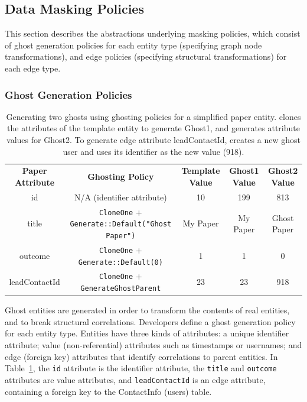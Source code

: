 \subsection{Data Masking Policies}
\label{sec:policies}

This section describes the abstractions underlying masking policies, which consist of ghost
generation policies for each entity type (specifying graph node transformations), and edge policies
(specifying structural transformations) for each edge type.

\subsubsection{Ghost Generation Policies}
\label{sec:ghosting}

\begin{table}[t!]
    \centering
    \footnotesize
\begin{tabular}{@{}ccccc@{}}
\textbf{Paper Attribute} & \textbf{Ghosting Policy} & \textbf{Template Value} & \textbf{Ghost1 Value} & \textbf{Ghost2 Value} 
  \\ \cmidrule(r){1-5}
    {id} & N/A (identifier attribute) & 10 & 199 & 813 \\
{title} & \texttt{CloneOne} + \texttt{Generate::Default("Ghost Paper")} & My Paper & My
    Paper & Ghost Paper \\
{outcome} & \texttt{CloneOne} + \texttt{Generate::Default(0)} & 1 & 1 & 0 \\
{leadContactId} & \texttt{CloneOne} + \texttt{GenerateGhostParent} & 23 & 23 & 918 \\
\end{tabular}
    \caption{Generating two ghosts using ghosting policies for a simplified paper entity.
    \sys clones the attributes of the template entity to generate Ghost1, and generates
    attribute values for Ghost2. To generate edge attribute leadContactId, \sys creates a new ghost user and uses its identifier as the new value (918).}
    \label{tab:ghosting}
\end{table}

Ghost entities are generated in order to transform the contents of real entities, and to
break structural correlations. Developers define a ghost generation policy for each entity type.
Entities have three kinds of attributes: a unique identifier attribute; value
(non-referential) attributes such as timestamps or usernames; and edge (foreign key)
attributes that identify correlations to parent entities.  
%
%
In Table~\ref{tab:ghosting}, the \texttt{id} attribute is the identifier attribute, the
\texttt{title} and \texttt{outcome} attributes are value attributes, and \texttt{leadContactId} is
an edge attribute, containing a foreign key to the ContactInfo (users) table. 

